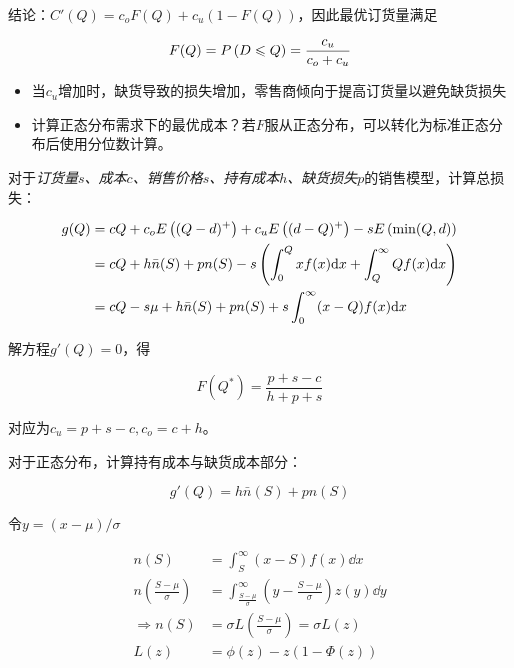 \documentclass{../notes}
\begin{document}
    结论：$C'(Q) = c_oF(Q) + c_u(1-F(Q))$，因此最优订货量满足

    \begin{equation}
        F(Q) = P\left(D\leqslant Q\right) = \frac{c_u}{c_o+c_u}
    \end{equation}

    \begin{itemize}
        \item 当$c_u$增加时，缺货导致的损失增加，零售商倾向于提高订货量以避免缺货损失
        \item 计算正态分布需求下的最优成本？若$F$服从正态分布，可以转化为标准正态分布后使用分位数计算。
    \end{itemize}

    \separate[0.5pt]

    对于\textit{订货量$s$、成本$c$、销售价格$s$、持有成本$h$、缺货损失$p$}的销售模型，计算总损失：

    \begin{equation}
        \begin{aligned}
            g(Q) &= cQ+c_oE\left((Q-d)^+\right) + c_uE\left((d-Q)^+\right) - sE\left(\min(Q, d)\right) \\
            &= cQ + h\bar n(S) + pn(S) - s\left(\int_0^Q xf(x)\mathrm d x + \int_Q^\infty Qf(x)\mathrm d x\right) \\
            &= cQ - s\mu + h\bar n(S) + pn(S) + s\int_0^\infty (x-Q)f(x)\mathrm d x
        \end{aligned}
    \end{equation}

    解方程$g'(Q) = 0$，得

    \begin{equation}
        F(Q^*) = \frac{p + s - c}{h + p + s}
    \end{equation}

    对应为$c_u = p + s - c, c_o = c + h$。

    对于正态分布，计算持有成本与缺货成本部分：

    \begin{equation}
        g'(Q) = h\bar n(S) + pn(S)
    \end{equation}

    令$y=(x-\mu) / \sigma$

    \begin{equation*}
        \begin{aligned}
            n(S) &= \int_S^\infty (x-S)f(x)\dd x \\
            n\left(\frac{S-\mu}{\sigma}\right) &= \int_{\frac{S-\mu}{\sigma}}^\infty \left(y - \frac{S-\mu}{\sigma}\right)z(y)\dd y \\
            \Rightarrow n(S)&= \sigma L\left(\frac{S-\mu}{\sigma}\right) = \sigma L(z) \\
            L(z) &= \phi(z) - z(1 - \Phi(z))
        \end{aligned}
    \end{equation*}
\end{document}

